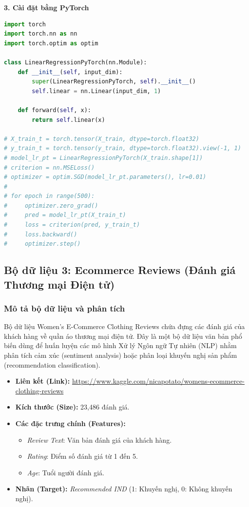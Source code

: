 \textbf{3. Cài đặt bằng PyTorch}
\begin{lstlisting}[language=Python]
import torch
import torch.nn as nn
import torch.optim as optim

class LinearRegressionPyTorch(nn.Module):
    def __init__(self, input_dim):
        super(LinearRegressionPyTorch, self).__init__()
        self.linear = nn.Linear(input_dim, 1)
        
    def forward(self, x):
        return self.linear(x)

# X_train_t = torch.tensor(X_train, dtype=torch.float32)
# y_train_t = torch.tensor(y_train, dtype=torch.float32).view(-1, 1)
# model_lr_pt = LinearRegressionPyTorch(X_train.shape[1])
# criterion = nn.MSELoss()
# optimizer = optim.SGD(model_lr_pt.parameters(), lr=0.01)
#
# for epoch in range(500):
#     optimizer.zero_grad()
#     pred = model_lr_pt(X_train_t)
#     loss = criterion(pred, y_train_t)
#     loss.backward()
#     optimizer.step()
\end{lstlisting}

\newpage
\subsection{Bộ dữ liệu 3: Ecommerce Reviews (Đánh giá Thương mại Điện tử)}

\subsubsection{Mô tả bộ dữ liệu và phân tích}
Bộ dữ liệu Women's E-Commerce Clothing Reviews chứa đựng các đánh giá của khách hàng về quần áo thương mại điện tử. Đây là một bộ dữ liệu văn bản phổ biến dùng để huấn luyện các mô hình Xử lý Ngôn ngữ Tự nhiên (NLP) nhằm phân tích cảm xúc (sentiment analysis) hoặc phân loại khuyến nghị sản phẩm (recommendation classification).

\begin{itemize}
    \item \textbf{Liên kết (Link):} \url{https://www.kaggle.com/nicapotato/womens-ecommerce-clothing-reviews}
    \item \textbf{Kích thước (Size):} 23,486 đánh giá.
    \item \textbf{Các đặc trưng chính (Features):}
    \begin{itemize}
        \item \textit{Review Text}: Văn bản đánh giá của khách hàng.
        \item \textit{Rating}: Điểm số đánh giá từ 1 đến 5.
        \item \textit{Age}: Tuổi người đánh giá.
    \end{itemize}
    \item \textbf{Nhãn (Target):} \textit{Recommended IND} (1: Khuyến nghị, 0: Không khuyến nghị).
\end{itemize}

